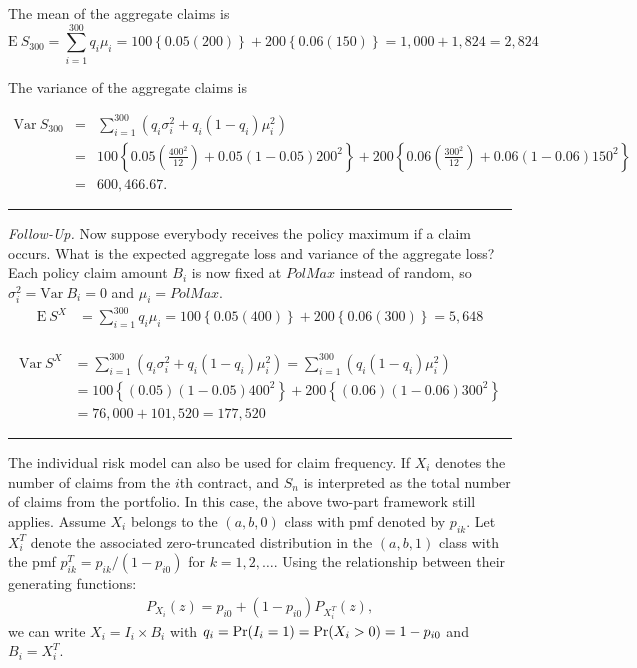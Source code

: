 \documentclass[]{book}
\theoremstyle{definition}
\theoremstyle{definition}
\theoremstyle{definition}
\theoremstyle{remark}
\begin{document}
The mean of the aggregate claims is
\[\mathrm{E~} S_{300} = \sum_{i=1}^{300} q_i \mu_i = 100\left\{0.05(200)\right\} + 200\left\{0.06 (150) \right\} = 1,000+1,824 =
2,824\]

The variance of the aggregate claims is

\begin{eqnarray*}
    \mathrm{Var~}S_{300} &=& \sum_{i=1}^{300} \left( q_i \sigma _i^2+q_i (1-q_i
    )\mu_i^2 \right) \\
    &=& 100\left\{ 0.05 \left(\frac{400^2}{12}\right) +0.05 (1-0.05 )200^2 \right\}+
    200\left\{
    0.06 \left(\frac{300^2}{12}\right) +0.06 (1-0.06 )150^2 \right\}\\
    &=& 600,466.67 .
\end{eqnarray*}

\begin{center}\rule{0.5\linewidth}{\linethickness}\end{center}

\emph{Follow-Up.} Now suppose everybody receives the policy maximum if a
claim occurs. What is the expected aggregate loss and variance of the
aggregate loss? Each policy claim amount \(B_i\) is now fixed at
\(PolMax\) instead of random, so \(\sigma_i^2 = \mathrm{Var~} B_i = 0\)
and \(\mu_i = PolMax\). \[\begin{aligned}
\mathrm{E~}S^X &= \sum_{i=1}^{300} q_i \mu_i = 100 \left\{0.05(400) \right\} + 200 \left\{ 0.06(300) \right\} = 5,648
\end{aligned}\]\\
\[\begin{aligned}
\mathrm{Var~}S^X &= \sum_{i=1}^{300} \left( q_i \sigma _i^2+q_i (1-q_i
)\mu_i^2 \right) = \sum_{i=1}^{300} \left( q_i (1-q_i) \mu_i^2 \right) \\
&= 100 \left\{(0.05) (1-0.05) 400^2\right\} +
200 \left\{(0.06) (1-0.06)300^2\right\} \\
&= 76,000 + 101,520 = 177,520
\end{aligned}\]

\begin{center}\rule{0.5\linewidth}{\linethickness}\end{center}

The individual risk model can also be used for claim frequency. If
\(X_i\) denotes the number of claims from the \(i\)th contract, and
\(S_n\) is interpreted as the total number of claims from the portfolio.
In this case, the above two-part framework still applies. Assume \(X_i\)
belongs to the \((a,b,0)\) class with pmf denoted by \(p_{ik}\). Let
\(X_i^{T}\) denote the associated zero-truncated distribution in the
\((a,b,1)\) class with the pmf \(p_{ik}^T=p_{ik}/(1-p_{i0})\) for
\(k=1,2,\ldots\). Using the relationship between their generating
functions: \[\begin{aligned}
P_{X_i}(z) = p_{i0} +(1-p_{i0}) P_{X_i^{T}}(z),
\end{aligned}\] we can write \(X_i=I_i\times B_i\) with
\(q_i={\rm Pr}(I_i=1)={\rm Pr}(X_i>0)=1-p_{i0}\) and \(B_i=X_i^T\).
\end{document}
